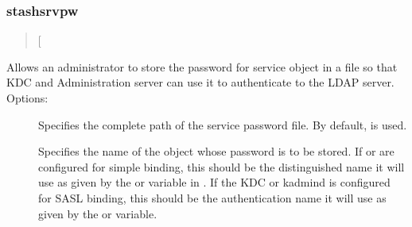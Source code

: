 \documentclass[letterpaper,10pt,english]{sphinxmanual}
\begin{document}
%
\begin{sphinxVerbatim}[commandchars=\\\{\}]
    
     
  
\end{sphinxVerbatim}


\subsubsection{stashsrvpw}
\label{\detokenize{admin/admin_commands/kdb5_ldap_util:kdb5-ldap-util-list-end}}\label{\detokenize{admin/admin_commands/kdb5_ldap_util:stashsrvpw}}\label{\detokenize{admin/admin_commands/kdb5_ldap_util:kdb5-ldap-util-stashsrvpw}}\begin{quote}

{[} \sphinxstyleemphasis{filename}{]}
\end{quote}

Allows an administrator to store the password for service object in a
file so that KDC and Administration server can use it to authenticate
to the LDAP server.  Options:
\begin{description}
\item[{ }] \leavevmode
Specifies the complete path of the service password file. By
default,  is used.

\item[{}] \leavevmode
Specifies the name of the object whose password is to be stored.
If {\hyperref[\detokenize{admin/admin_commands/krb5kdc:krb5kdc-8}]{}} or {\hyperref[\detokenize{admin/admin_commands/kadmind:kadmind-8}]{}} are configured for
simple binding, this should be the distinguished name it will
use as given by the  or 
variable in {\hyperref[\detokenize{admin/conf_files/kdc_conf:kdc-conf-5}]{}}.  If the KDC or kadmind is
configured for SASL binding, this should be the authentication
name it will use as given by the  or
 variable.

\end{description}
\end{document}

